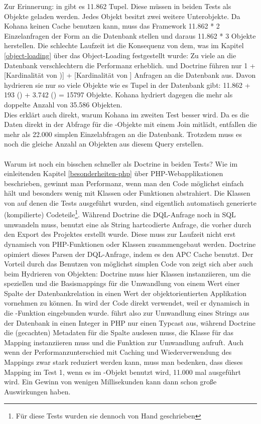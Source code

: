Zur Erinnerung: in  gibt es 11.862 Tupel. Diese müssen in beiden Tests als Objekte geladen werden. Jedes Objekt besitzt zwei weitere Unterobjekte. Da Kohana keinen Cache benutzen kann, muss das Framework 11.862 * 2 Einzelanfragen der Form  an die Datenbank stellen und daraus 11.862 * 3 Objekte herstellen. Die schlechte Laufzeit ist die Konsequenz von dem, was im Kapitel \ref{object-loading} über das Object-Loading festgestellt wurde: Zu viele  an die Datenbank verschlechtern die Performanz erheblich. \PSCORM und Doctrine führen nur 1 + [Kardinalität von )] + [Kardinalität von ] Anfragen an die Datenbank aus. Davon hydrieren sie nur so viele Objekte wie es Tupel in der Datenbank gibt: 11.862 + 193 () + 3.742 () = 15797 Objekte. Kohana hydriert dagegen die mehr als doppelte Anzahl von 35.586 Objekten. \\
Dies erklärt auch direkt, warum Kohana im zweiten Test besser wird. Da es die Daten direkt in der Abfrage für die -Objekte mit einem Join mitlädt, entfallen die mehr als 22.000 simplen Einzelabfragen an die Datenbank. Trotzdem muss es noch die gleiche Anzahl an Objekten aus diesem Query erstellen. \\
\\
Warum ist \PSCORM noch ein bisschen schneller als Doctrine in beiden Tests? Wie im einleitenden Kapitel \ref{besonderheiten-php} über PHP-Webapplikationen beschrieben, gewinnt man Performanz, wenn man den Code möglichst einfach hält und besonders wenig mit Klassen oder Funktionen abstrahiert. Die Klassen von \PSCORM auf denen die Tests ausgeführt wurden, sind eigentlich automatisch generierte (kompilierte) Codeteile\footnote{Für diese Tests wurden sie dennoch von Hand geschrieben}. Während Doctrine die DQL-Anfrage noch in SQL umwandeln muss, benutzt \PSCORM eine als String hartcodierte Anfrage, die vorher durch den Export des Projektes erstellt wurde. Diese muss zur Laufzeit nicht erst dynamisch von PHP-Funktionen oder Klassen zusammengebaut werden. Doctrine opimiert dieses Parsen der DQL-Anfrage, indem es den APC Cache benutzt. Der Vorteil durch das Benutzen von möglichst simplen Code von \PSCORM zeigt sich aber auch beim Hydrieren von Objekten: Doctrine muss hier Klassen instanziieren, um die speziellen und die Basismappings für die Umwandlung von einem Wert einer Spalte der Datenbankrelation in einen Wert der objektorientierten Applikation vornehmen zu können. In \PSCORM wird der Code direkt verwendet, weil er dynamisch in die -Funktion eingebunden wurde. \PSCORM führt also zur Umwandlung eines Strings aus der Datenbank in einen Integer in PHP nur einen Typcast aus, während Doctrine die (gecachten) Metadaten für die Spalte auslesen muss, die Klasse für das Mapping instanziieren muss und die Funktion zur Umwandlung aufruft. Auch wenn der Performanzunterschied mit Caching und Wiederverwendung des Mappings zwar stark reduziert werden kann, muss man bedenken, dass dieses Mapping im Test 1, wenn es im -Objekt benutzt wird, 11.000 mal ausgeführt wird. Ein Gewinn von wenigen Millisekunden kann dann schon große Auswirkungen haben.\\

